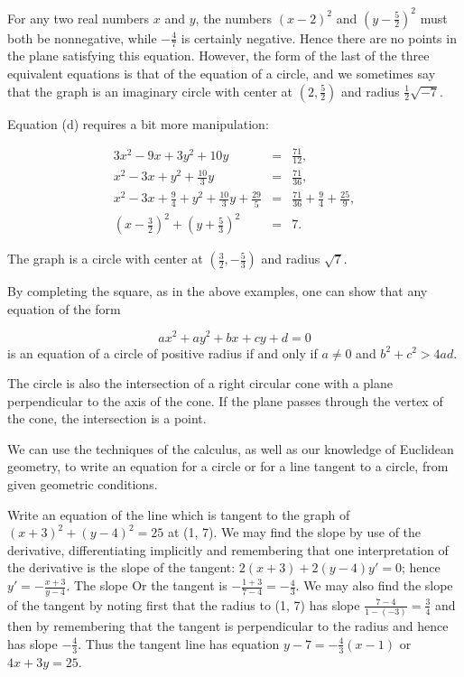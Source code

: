 \begin{example}
For any two real numbers $x$ and $y$, the numbers $(x-2)^2$ and $(y-\frac{5}{2})^2$ must both be nonnegative, while $-\frac{4}{7}$ is certainly negative. Hence there are no points in the plane satisfying this equation. However, the form of the last of the three equivalent equations is that of the equation of a circle, and we sometimes say that the graph is an imaginary circle with center at $(2, \frac{5}{2})$ and radius $\frac{1}{2}\sqrt{-7}$.

Equation (d) requires a bit more manipulation:

\begin{eqnarray*}
                                                  3x^2 - 9x + 3y^2 + 10y &=& \frac{71}{12},\\
                                         x^2 - 3x + y^2 + \frac{10}{3}y &=& \frac{71}{36},\\
x^2 - 3x + \frac{9}{4} + y^2 + \frac{10}{3}y + \frac{29}{5} &=& \frac{71}{36} + \frac{9}{4} + \frac{25}{9}, \\
                             (x - \frac{3}{2})^2 + (y + \frac{5}{3})^2 &=& 7.
\end{eqnarray*}

\noindent The graph is a circle with center at $(\frac{3}{2}, -\frac{5}{3})$ and radius $\sqrt7$.
\end{example}
\medskip

By completing the square, as in the above examples, one can show that any equation of the form

$$
ax^2 + ay^2 + bx + cy + d = 0
$$
\noindent is an equation of a circle of positive radius if and only if $a \neq 0$ and $b^2 + c^2 > 4ad$.

The circle is also the intersection of a right circular cone with a plane perpendicular to the axis of the cone. If the plane passes through the vertex of the cone, the intersection is a point.

We can use the techniques of the calculus, as well as our knowledge of Euclidean geometry, to write an equation for a circle or for a line tangent to a circle, from given geometric conditions.

\begin{example}
Write an equation of the line which is tangent to the graph of $(x + 3)^2 + (y - 4)^2
= 25$ at (1, 7). We may find the slope by use of the derivative, differentiating implicitly and remembering that one interpretation of the derivative is the slope of the tangent: $2(x + 3) + 2(y - 4)y' = 0$; hence $y' = - \frac{x + 3}{y - 4}$. The slope Or the tangent is $-\frac{1 + 3}{7 - 4} = - \frac{4}{3}$. We
may also find the slope of the tangent by noting first that the radius to (1, 7) has slope $\frac{7-4}{1- (-3)}= \frac{3}{4}$ and then by remembering that the tangent is perpendicular to the radius and hence has slope $-\frac{4}{3}$. Thus the tangent line has equation $y-7 = - \frac{4}{3}(x-1)$ or $4x + 3y = 25$.
\end{example}


